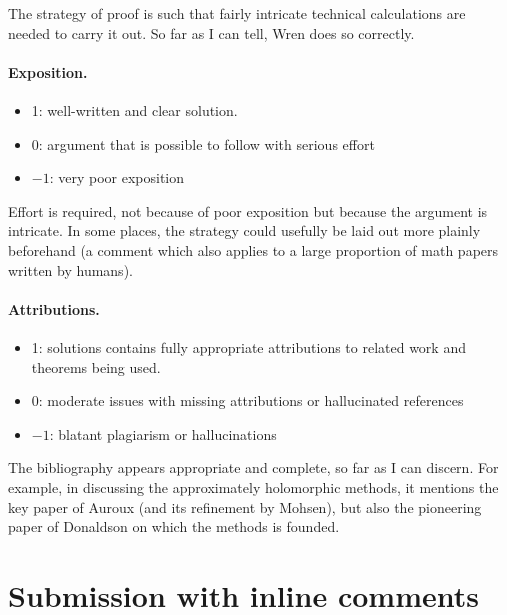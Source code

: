 \documentclass[11pt]{article}
\theoremstyle{remark}
\begin{document}
\vspace{5mm}

  The strategy of proof is such that fairly intricate technical calculations are needed to carry it out. So far as I can tell, Wren does so correctly.


\paragraph{Exposition.}
\begin{itemize}
	\item  1: well-written and clear solution.
	\item  0: argument that is possible to follow with serious effort
	\item  $-1$: very poor exposition
\end{itemize}

 Effort is required, not because of poor exposition but because the argument is intricate. In some places, the strategy could usefully be laid out more plainly beforehand (a comment which also applies to a large proportion of math papers written by humans).

\paragraph{Attributions.}
\begin{itemize}
	\item  1: solutions contains fully appropriate attributions
		to related work and theorems being used.
	\item  0: moderate issues with missing attributions or hallucinated references
	\item  $-1$: blatant plagiarism or hallucinations
\end{itemize}

 The bibliography appears appropriate and complete, so far as I can discern. For example, in discussing the approximately holomorphic methods, it mentions the key paper of Auroux (and its refinement by Mohsen), but also the pioneering paper of Donaldson on which the methods is founded.

\newpage
\section{Submission with inline comments}
\end{document}
